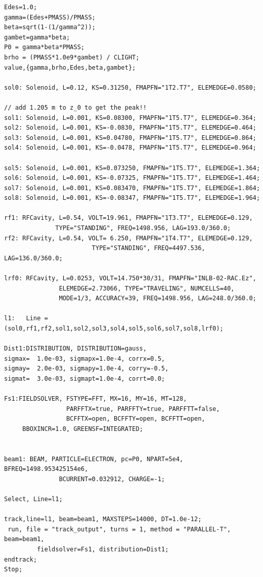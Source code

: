 \documentclass{psi-note}    %
\begin{document}
{\begin{verbatim}
Edes=1.0;
gamma=(Edes+PMASS)/PMASS;
beta=sqrt(1-(1/gamma^2));
gambet=gamma*beta;
P0 = gamma*beta*PMASS;
brho = (PMASS*1.0e9*gambet) / CLIGHT;
value,{gamma,brho,Edes,beta,gambet};

sol0: Solenoid, L=0.12, KS=0.31250, FMAPFN="1T2.T7", ELEMEDGE=0.0580;

// add 1.205 m to z_0 to get the peak!!
sol1: Solenoid, L=0.001, KS=0.08300, FMAPFN="1T5.T7", ELEMEDGE=0.364;
sol2: Solenoid, L=0.001, KS=-0.0830, FMAPFN="1T5.T7", ELEMEDGE=0.464;
sol3: Solenoid, L=0.001, KS=0.04780, FMAPFN="1T5.T7", ELEMEDGE=0.864;
sol4: Solenoid, L=0.001, KS=-0.0478, FMAPFN="1T5.T7", ELEMEDGE=0.964;

sol5: Solenoid, L=0.001, KS=0.073250, FMAPFN="1T5.T7", ELEMEDGE=1.364;
sol6: Solenoid, L=0.001, KS=-0.07325, FMAPFN="1T5.T7", ELEMEDGE=1.464;
sol7: Solenoid, L=0.001, KS=0.083470, FMAPFN="1T5.T7", ELEMEDGE=1.864;
sol8: Solenoid, L=0.001, KS=-0.08347, FMAPFN="1T5.T7", ELEMEDGE=1.964;

rf1: RFCavity, L=0.54, VOLT=19.961, FMAPFN="1T3.T7", ELEMEDGE=0.129, 
   		      TYPE="STANDING", FREQ=1498.956, LAG=193.0/360.0;
rf2: RFCavity, L=0.54, VOLT= 6.250, FMAPFN="1T4.T7", ELEMEDGE=0.129, 
                        TYPE="STANDING", FREQ=4497.536, LAG=136.0/360.0;

lrf0: RFCavity, L=0.0253, VOLT=14.750*30/31, FMAPFN="INLB-02-RAC.Ez", 
		       ELEMEDGE=2.73066, TYPE="TRAVELING", NUMCELLS=40, 
		       MODE=1/3, ACCURACY=39, FREQ=1498.956, LAG=248.0/360.0;

l1:   Line = (sol0,rf1,rf2,sol1,sol2,sol3,sol4,sol5,sol6,sol7,sol8,lrf0);

Dist1:DISTRIBUTION, DISTRIBUTION=gauss,
sigmax=  1.0e-03, sigmapx=1.0e-4, corrx=0.5,
sigmay=  2.0e-03, sigmapy=1.0e-4, corry=-0.5,
sigmat=  3.0e-03, sigmapt=1.0e-4, corrt=0.0;

Fs1:FIELDSOLVER, FSTYPE=FFT, MX=16, MY=16, MT=128,
                 PARFFTX=true, PARFFTY=true, PARFFTT=false,
                 BCFFTX=open, BCFFTY=open, BCFFTT=open,
     BBOXINCR=1.0, GREENSF=INTEGRATED;


beam1: BEAM, PARTICLE=ELECTRON, pc=P0, NPART=5e4, BFREQ=1498.953425154e6, 
               BCURRENT=0.032912, CHARGE=-1;

Select, Line=l1;

track,line=l1, beam=beam1, MAXSTEPS=14000, DT=1.0e-12;
 run, file = "track_output", turns = 1, method = "PARALLEL-T", beam=beam1, 
         fieldsolver=Fs1, distribution=Dist1;
endtrack;
Stop;

\end{verbatim}

}
\end{document}
